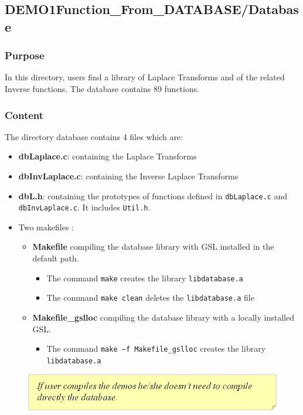 \documentclass[10pt]{article}
\begin{document}
\subsection{DEMO1\textendash Function\_From\_DATABASE/Database}

\subsubsection{Purpose}
In this directory, users find a library of Laplace Transforms and of the related Inverse functions.
The database contains 89 functions.


\subsubsection{Content}
The directory database contains 4 files which are:
\begin{itemize}
	\item \textbf{dbLaplace.c}:	containing the Laplace Transforms
	\item \textbf{dbInvLaplace.c}:	containing the Inverse Laplace Transforms
	\item \textbf{dbL.h}:	containing the prototypes of functions defined in {\tt dbLaplace.c} and {\tt dbInvLaplace.c}. It includes {\tt Util.h}.
	\item Two makefiles :
	    \begin{itemize}
	    \item \textbf{Makefile} compiling the database library with GSL installed in the default path.
		    \begin{itemize}
		    \item The command {\tt make} creates the library {\tt libdatabase.a}
		    \item The command {\tt make clean} deletes the {\tt libdatabase.a} file
		    \end{itemize}
	    \item \textbf{Makefile\_gslloc} compiling the database library with a locally installed GSL.
		    \begin{itemize}
		    \item The command {\tt make –f Makefile\_gslloc} creates the library {\tt libdatabase.a}
		    \end{itemize}
	    \end{itemize}
\end{itemize}

 \begin{figure}[!h]
\begin{flushright}
\includegraphics[scale=0.8]{Immagine14}
\end{flushright}
\end{figure}
\end{document}
